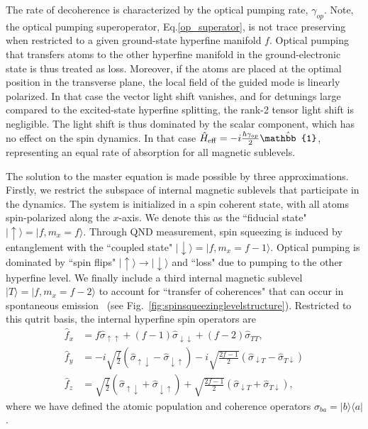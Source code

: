\documentclass[aps,pra,twocolumn,superscriptaddress]{revtex4-1} %
\def\bra#1{\langle{#1}\rvert}%
\def\ket#1{\lvert{#1}\rangle}%
\begin{document}
The rate of decoherence is characterized by the optical pumping rate, $\gamma_{op}$.  Note, the optical pumping superoperator, Eq.\eqref{op_superator},  is not trace preserving when restricted to a given ground-state hyperfine manifold $f$.  Optical pumping that transfers atoms to the other hyperfine manifold in the ground-electronic state is thus treated as loss. Moreover, if the atoms are placed at the optimal position in the transverse plane, the local field of the guided mode is linearly polarized.  In that case the vector light shift vanishes, and for detunings large compared to the excited-state hyperfine splitting, the rank-2 tensor light shift is negligible. The light shift is thus dominated by the scalar component, which has no effect on the spin dynamics. In that case $\hat{H}_{\rm eff} = -i \frac{\hbar\gamma_{op}}{2} \hat{\mathbb{1}}$, representing an equal rate of absorption for all magnetic sublevels.

The solution to the master equation is made possible by three approximations. Firstly, we restrict the subspace of internal magnetic sublevels that participate in the dynamics.  The system is initialized in a spin coherent state, with all atoms spin-polarized along the $x$-axis.  We denote this as the ``fiducial state" $\ket{\uparrow} = \ket{f, m_x =f}$.   Through QND measurement, spin squeezing is induced by entanglement with the  ``coupled state"  $\ket{\downarrow} = \ket{f, m_x=f-1}$.  Optical pumping is dominated by ``spin flips" $\ket{\uparrow}\rightarrow \ket{\downarrow}$ and ``loss" due to pumping to the other hyperfine level.  We finally include a third internal magnetic sublevel $\ket{T} = \ket{f, m_x=f-2}$ to account for  ``transfer of coherences" that can occur in spontaneous emission~\cite{Norris2012Enhanced,Norris2014} (see Fig.~\ref{fig:spinsqueezinglevelstructure}).  Restricted to this qutrit basis, the internal hyperfine spin operators are
\begin{subequations}\label{eq:f_in_xbasis}
\begin{align}
\hat{f}_x &= f \hat{\sigma}_{\uparrow \uparrow} +(f-1) \hat{\sigma}_{\downarrow \downarrow} + (f-2)  \hat{\sigma}_{T T}, \\
\hat{f}_y &=-i \sqrt{\frac{f}{2}} \left(\hat{\sigma}_{\uparrow \downarrow} \!-\! \hat{\sigma}_{\downarrow \uparrow}\right) \!-i \sqrt{\frac{2f-1}{2}}  \left(\hat{\sigma}_{\downarrow T} \!-\! \hat{\sigma}_{T \downarrow }\right) \\
\hat{f}_z &= \sqrt{\frac{f}{2}} \left(\hat{\sigma}_{\uparrow \downarrow} + \hat{\sigma}_{\downarrow \uparrow}\right) + \sqrt{\frac{2f-1}{2}}  \left(\hat{\sigma}_{\downarrow T} + \hat{\sigma}_{T \downarrow }\right),
\end{align}
\end{subequations}
where we have defined the atomic population and coherence operators $\hat{\sigma}_{ba}=\ket{b}\bra{a}$.
\end{document}
